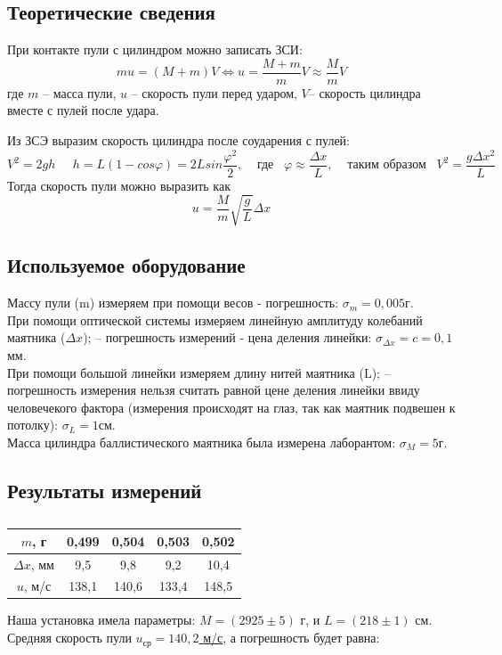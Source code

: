 \documentclass[a4paper,14pt]{extarticle}
\begin{document}
	\subsection{Теоретические сведения}
	\begin{center}
		При контакте пули с цилиндром можно записать ЗСИ:
		\begin{equation}
			mu = (M+m)V \Leftrightarrow u=\frac{M+m}{m}V \approx \frac{M}{m}V 
		\end{equation}
		где $m$ -- масса пули, $u$ -- скорость пули перед ударом, $V$-- скорость цилиндра вместе с пулей после удара.
 	\end{center}
    Из ЗСЭ выразим скорость цилиндра после соударения с пулей:
	\begin{equation}
		 V^2=2gh \;\;\;\;\; h = L(1-cos \varphi ) = 2L sin \frac{\varphi^2}{2}, \;\;\;\;\text{где}\;\;\; \varphi \approx \frac{\Delta x}{L},\;\;\;\; \text{таким образом}\;\;\; V^2=\frac{g\Delta x^2}{L}
	\end{equation}
	Тогда скорость пули можно выразить как
	\begin{equation} \label{vel1}
		u=\frac{M}{m} \sqrt{\frac{g}{L}} \Delta x
	\end{equation}
	\subsection{Используемое оборудование}
	Массу пули (m) измеряем при помощи весов - погрешность: $\sigma_m = 0,005$г.
	\\При помощи оптической системы измеряем линейную амплитуду колебаний маятника ($\Delta x$); -- погрешность измерений - цена деления линейки: $\sigma_{\Delta x} = c = 0,1$мм.
	\\При помощи большой линейки измеряем длину нитей маятника (L); -- погрешность измерения нельзя считать равной цене деления линейки ввиду человечекого фактора (измерения происходят на глаз, так как маятник подвешен к потолку): $\sigma_L = 1$см.
	\\Масса цилиндра баллистического маятника была измерена лаборантом: $\sigma_M = 5$г.
	\subsection{Результаты измерений} 	
	\begin{table}[H]
		\begin{center}
			\begin{tabular}[H]{|c|c|c|c|c|}
				\hline
				$m$, г & 0,499 & 0,504 & 0,503 & 0,502\\ \hline
				$\Delta x$, мм & 9,5 & 9,8 & 9,2 & 10,4\\ \hline
				$u$, м/с & 138,1 & 140,6 & 133,4 & 148,5 \\ \hline
			\end{tabular}
			\caption{}
		\end{center}
	\end{table}
	Наша установка имела параметры: $M = (2925 \pm 5)$ г, и $L = (218 \pm 1)$ см.
	Средняя скорость пули \underline{$u_\text{ср} = 140,2$ м/с}, а погрешность будет равна:
	
\end{document}
